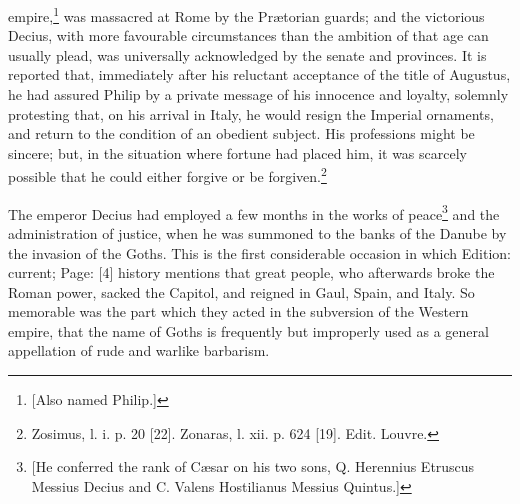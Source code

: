 empire,\footnote{[Also named Philip.]} was massacred at Rome by the Prætorian guards; and the victorious Decius, with more favourable circumstances than the ambition of that age can usually plead, was universally acknowledged by the senate and provinces. It is reported that, immediately after his reluctant acceptance of the title of Augustus, he had assured Philip by a private message of his innocence and loyalty, solemnly protesting that, on his arrival in Italy, he would resign the Imperial ornaments, and return to the condition of an obedient subject. His professions might be sincere; but, in the situation where fortune had placed him, it was scarcely possible that he could either forgive or be forgiven.\footnote{Zosimus, l. i. p. 20 [22]. Zonaras, l. xii. p. 624 [19]. Edit. Louvre.}

The emperor Decius had employed a few months in the works of peace\footnote{[He conferred the rank of Cæsar on his two sons, Q. Herennius Etruscus Messius Decius and C. Valens Hostilianus Messius Quintus.]} and the administration of justice, when he was summoned to the banks of the Danube by the invasion of the Goths. This is the first considerable occasion in which Edition: current; Page: [4] history mentions that great people, who afterwards broke the Roman power, sacked the Capitol, and reigned in Gaul, Spain, and Italy. So memorable was the part which they acted in the subversion of the Western empire, that the name of Goths is frequently but improperly used as a general appellation of rude and warlike barbarism.

